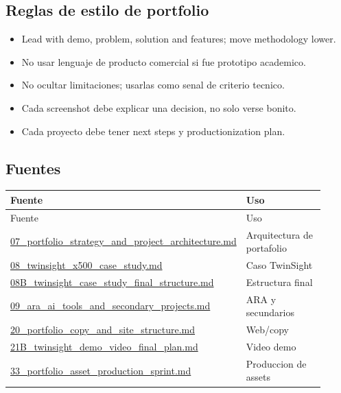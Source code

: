 \subsection{Reglas de estilo de portfolio}


\begin{itemize}
\item Lead with demo, problem, solution and features; move methodology lower.
\item No usar lenguaje de producto comercial si fue prototipo academico.
\item No ocultar limitaciones; usarlas como senal de criterio tecnico.
\item Cada screenshot debe explicar una decision, no solo verse bonito.
\item Cada proyecto debe tener next steps y productionization plan.
\end{itemize}


\subsection{Fuentes}


\begin{center}
\scriptsize
\begin{longtable}{>{\raggedright\arraybackslash}p{0.455\linewidth} >{\raggedright\arraybackslash}p{0.455\linewidth}}
\toprule
Fuente & Uso \\
\midrule
\endfirsthead
\toprule
Fuente & Uso \\
\midrule
\endhead
\href{file:///E:/Laboral/07_portfolio_strategy_and_project_architecture.md}{07\_portfolio\_strategy\_and\_project\_architecture.md} & Arquitectura de portafolio \\
\href{file:///E:/Laboral/08_twinsight_x500_case_study.md}{08\_twinsight\_x500\_case\_study.md} & Caso TwinSight \\
\href{file:///E:/Laboral/08B_twinsight_case_study_final_structure.md}{08B\_twinsight\_case\_study\_final\_structure.md} & Estructura final \\
\href{file:///E:/Laboral/09_ara_ai_tools_and_secondary_projects.md}{09\_ara\_ai\_tools\_and\_secondary\_projects.md} & ARA y secundarios \\
\href{file:///E:/Laboral/20_portfolio_copy_and_site_structure.md}{20\_portfolio\_copy\_and\_site\_structure.md} & Web/copy \\
\href{file:///E:/Laboral/21B_twinsight_demo_video_final_plan.md}{21B\_twinsight\_demo\_video\_final\_plan.md} & Video demo \\
\href{file:///E:/Laboral/33_portfolio_asset_production_sprint.md}{33\_portfolio\_asset\_production\_sprint.md} & Produccion de assets \\
\bottomrule
\end{longtable}
\end{center}
